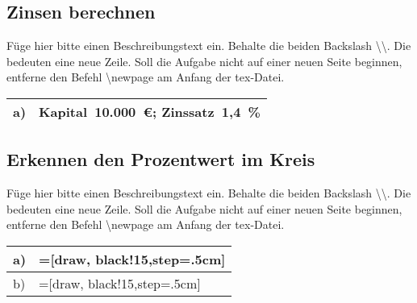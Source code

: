 \subsection{Zinsen berechnen}
Füge hier bitte einen Beschreibungstext ein. Behalte die beiden Backslash \textbackslash\textbackslash. Die bedeuten eine neue Zeile. Soll die Aufgabe nicht auf einer neuen Seite beginnen, entferne den Befehl \textbackslash newpage am Anfang der tex-Datei.\\
\begin{xltabular}{\textwidth}{|C{0.75cm}|X|}
\hline
a)&Kapital~10.000~€;  Zinssatz~1,4~\%
\\\hline
\end{xltabular}
\vspace{0.5cm}
\subsection{Erkennen den Prozentwert im Kreis}
Füge hier bitte einen Beschreibungstext ein. Behalte die beiden Backslash \textbackslash\textbackslash. Die bedeuten eine neue Zeile. Soll die Aufgabe nicht auf einer neuen Seite beginnen, entferne den Befehl \textbackslash newpage am Anfang der tex-Datei.\\
\begin{xltabular}{\textwidth}{|C{0.75cm}|X|}
\hline
a)&=[draw, black!15,step=.5cm]
\\\hline
b)&=[draw, black!15,step=.5cm]
\\\hline
\end{xltabular}
\vspace{0.5cm}
